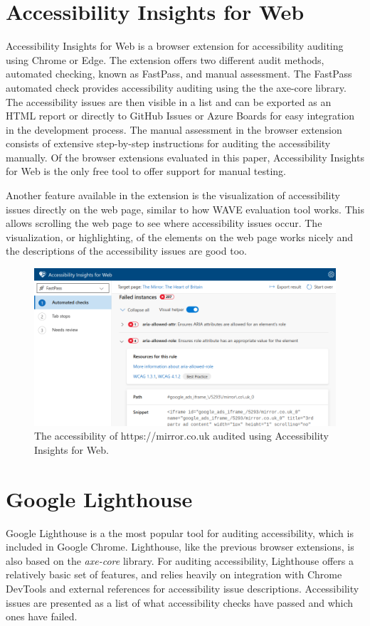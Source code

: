 \section{Accessibility Insights for Web}
Accessibility Insights for Web \parencite{accessibility_insights} is a browser extension for accessibility auditing using Chrome or Edge.
The extension offers two different audit methods, automated checking, known as FastPass, and manual assessment.
The FastPass automated check provides accessibility auditing using the the axe-core library.
The accessibility issues are then visible in a list and can be exported as an HTML report or directly to GitHub Issues or Azure Boards for easy integration in the development process.
The manual assessment in the browser extension consists of extensive step-by-step instructions for auditing the accessibility manually.
Of the browser extensions evaluated in this paper, Accessibility Insights for Web is the only free tool to offer support for manual testing.

Another feature available in the extension is the visualization of accessibility issues directly on the web page, similar to how WAVE evaluation tool works.
This allows scrolling the web page to see where accessibility issues occur.
The visualization, or highlighting, of the elements on the web page works nicely and the descriptions of the accessibility issues are good too.


\begin{figure}[h]
\centering
\includegraphics[keepaspectratio,width=\linewidth,height=\halfh]
{images/insights-ext.png}

\caption[Accessibility Insights for Web]{
The accessibility of https://mirror.co.uk audited using Accessibility Insights for Web.
}
\label{fig:insights-ext}
\end{figure}

\section{Google Lighthouse}
Google Lighthouse \parencite{lighthouse} is a the most popular tool for auditing accessibility, which is included in Google Chrome.
Lighthouse, like the previous browser extensions, is also based on the \emph{axe-core} library.
For auditing accessibility, Lighthouse offers a relatively basic set of features, and relies heavily on integration with Chrome DevTools and external references for accessibility issue descriptions.
Accessibility issues are presented as a list of what accessibility checks have passed and which ones have failed.

